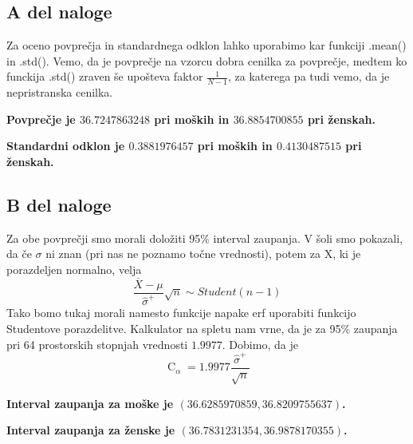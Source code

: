 \documentclass{article}
\DeclareMathOperator{\CM}{C}
\begin{document}
    \subsection{A del naloge}
    Za oceno povprečja in standardnega odklon lahko uporabimo kar funkciji .mean() in .std(). Vemo, da je povprečje na vzorcu dobra cenilka za povprečje, medtem ko funckija
    .std() zraven še upošteva faktor $\frac{1}{N - 1}$, za katerega pa tudi vemo, da je nepristranska cenilka.
    \par \textbf{Povprečje je $36.7247863248$ pri moških in $36.8854700855$ pri ženskah.}
    \par \textbf{Standardni odklon je $0.3881976457$ pri moških in $0.4130487515$ pri ženskah.}

    \subsection{B del naloge}
    Za obe povprečji smo morali doložiti 95\% interval zaupanja. V šoli smo pokazali, da če $\sigma$ ni znan (pri nas ne poznamo točne vrednosti), potem za X, ki je
    porazdeljen normalno, velja
    \[
        \frac{\overline{X} - \mu}{\widehat{\sigma}^{+}} \sqrt{n} \sim Student(n - 1)
    \]
    Tako bomo tukaj morali namesto funkcije napake erf uporabiti funkcijo Studentove porazdelitve. Kalkulator na spletu nam vrne, da je za 95\% zaupanja pri 64 prostorskih stopnjah
    vrednosti $1.9977$. Dobimo, da je 
    \[
        \CM_{\alpha} = 1.9977\frac{\widehat{\sigma}^{+}}{\sqrt{n}}
    \]
    \par \textbf{Interval zaupanja za moške je $(36.6285970859, 36.8209755637)$.}
    \par \textbf{Interval zaupanja za ženske je $(36.7831231354, 36.9878170355)$.}
\end{document}
